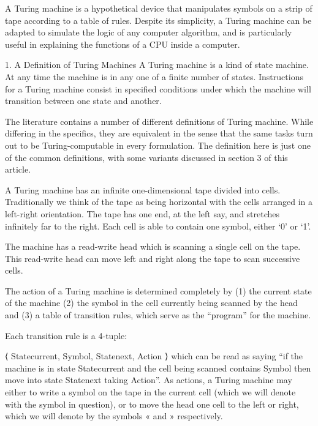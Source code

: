 A Turing machine is a hypothetical device that manipulates symbols on a strip of tape according to a table of rules. Despite its simplicity, a Turing machine can be adapted to simulate the logic of any computer algorithm, and is particularly useful in explaining the functions of a CPU inside a computer.


1. A Definition of Turing Machines
A Turing machine is a kind of state machine. At any time the machine is in any one of a finite number of states. Instructions for a Turing machine consist in specified conditions under which the machine will transition between one state and another.

The literature contains a number of different definitions of Turing machine. While differing in the specifics, they are equivalent in the sense that the same tasks turn out to be Turing-computable in every formulation. The definition here is just one of the common definitions, with some variants discussed in section 3 of this article.

A Turing machine has an infinite one-dimensional tape divided into cells. Traditionally we think of the tape as being horizontal with the cells arranged in a left-right orientation. The tape has one end, at the left say, and stretches infinitely far to the right. Each cell is able to contain one symbol, either ‘0’ or ‘1’.

The machine has a read-write head which is scanning a single cell on the tape. This read-write head can move left and right along the tape to scan successive cells.

The action of a Turing machine is determined completely by (1) the current state of the machine (2) the symbol in the cell currently being scanned by the head and (3) a table of transition rules, which serve as the “program” for the machine.

Each transition rule is a 4-tuple:

⟨ Statecurrent, Symbol, Statenext, Action ⟩
which can be read as saying “if the machine is in state Statecurrent and the cell being scanned contains Symbol then move into state Statenext taking Action”. As actions, a Turing machine may either to write a symbol on the tape in the current cell (which we will denote with the symbol in question), or to move the head one cell to the left or right, which we will denote by the symbols « and » respectively.

